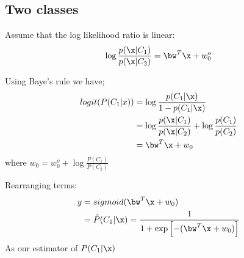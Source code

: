 \subsection{Two classes}
     Assume that the log likelihood ratio is linear:
        \[\log\frac{p(\x|C_1)}{p(\x|C_2)} = \bw^T\x + w_0^o \]

    Using Baye's rule we have;
        \begin{align*}
            logit(P(C_1|x)) & = \log\frac{p(C_1|\x)}{1 - p(C_1|\x)} \\
            & = \log\frac{p(\x|C_1)}{p(\x|C_2)} + \log\frac{p(C_1)}{p(C_2)} \\
            & = \bw^T\x + w_0
        \end{align*}
        where $w_0 = w_0^o + \log\frac{P(C_1)}{P(C_2)}$

       Rearranging terms: 
        \begin{align*} y  & = sigmoid(\bw^T\x + w_0) \\
            & =  \hat{P}(C_1|\x) = \frac{1}{1 + \exp\left[-(\bw^T\x + w_0 )\right]}
        \end{align*}
        As our estimator of $P(C_1|\x)$


